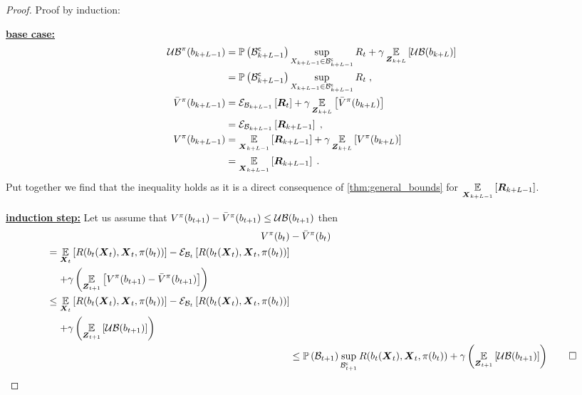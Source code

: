 \begin{proof}
	Proof by induction:

	\textbf{\underline{base case:}}
	\begin{align*}
		\upperbound\nolimits^\pi(\blf{k+L-1})&=\measure{\stcompI{\subSpace}{k+L-1}}\sup_{\states{k+L-1}\in\stcompI{\subSpace}{k+L-1}}R_t+\gamma\expectation{\upperbound(\blf{k+L})}{\observationsRV{k+L}}\\
		&=\measure{\stcompI{\subSpace}{k+L-1}}\sup_{\states{k+L-1}\in\stcompI{\subSpace}{k+L-1}}R_t\;,\\
		\bar{V}^\pi(\blf{k+L-1}) & =\partialexpectation{\boldsymbol{R}_t}{\subSpaceI{k+L-1}}
		+\gamma\expectation{\bar{V}^\pi(\blf{k+L})}{\observationsRV{k+L}}\\
		&=\partialexpectation{\boldsymbol{R}_{k+L-1}}{\subSpaceI{k+L-1}}\;,\\
		V^\pi(\blf{k+L-1})&=\expectation{\boldsymbol{R}_{k+L-1}}{\statesRV{k+L-1}}
		+\gamma\expectation{V^\pi(\blf{k+L})}{\observationsRV{k+L}}\\
		&=\expectation{\boldsymbol{R}_{k+L-1}}{\statesRV{k+L-1}}\;.
	\end{align*}
	Put together we find that the inequality holds as it is a direct consequence of \cref{thm:general_bounds} for $\expectation{\boldsymbol{R}_{k+L-1}}{\statesRV{k+L-1}}$.

	\textbf{\underline{induction step:}}
	Let us assume that $V^\pi(\blf{t+1})-\bar{V}^\pi(\blf{t+1})\leq\upperbound(\blf{t+1})$ then
	\begin{align*}
		V^\pi(\blf{t})&-\bar{V}^\pi(\blf{t})\\
		\begin{split}
			&=\expectation{R(\blf{t}(\statesRV{t}),\statesRV{t},\pi(\blf{t}))}{\statesRV{t}}-\partialexpectation{R(\blf{t}(\statesRV{t}),\statesRV{t},\pi(\blf{t}))}{\subSpaceI{t}} \\
			&\phantomeq+\gamma\left(\expectation{V^\pi(\blf{t+1})-\bar{V}^\pi(\blf{t+1})}{\observationsRV{t+1}}\right)
		\end{split}    \\
		\begin{split}
			&\leq\expectation{R(\blf{t}(\statesRV{t}),\statesRV{t},\pi(\blf{t}))}{\statesRV{t}}-\partialexpectation{R(\blf{t}(\statesRV{t}),\statesRV{t},\pi(\blf{t}))}{\subSpaceI{t}} \\
			&\phantomeq+\gamma\left(\expectation{\upperbound(\blf{t+1})}{\observationsRV{t+1}}\right)
		\end{split} \\
		&\leq\measure{\subSpaceI{t+1}}\sup_{\stcompI{\subSpace}{t+1}}R(\blf{t}(\statesRV{t}),\statesRV{t},\pi(\blf{t}))+\gamma\left(\expectation{\upperbound(\blf{t+1})}{\observationsRV{t+1}}\right)\qed
	\end{align*}
\end{proof}

